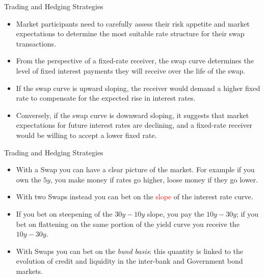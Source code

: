 \documentclass{beamer}
\begin{document}
\begin{frame}{Trading and Hedging Strategies}
\begin{itemize}
\item Market participants need to carefully assess their risk appetite and market expectations to determine the most suitable rate structure for their swap transactions.
\item From the perspective of a fixed-rate receiver, the swap curve determines the level of fixed interest payments they will receive over the life of the swap. 
\item If the swap curve is upward sloping, the receiver would demand a higher fixed rate to compensate for the expected rise in interest rates. 
\item Conversely, if the swap curve is downward sloping, it suggests that market expectations for future interest rates are declining, and a fixed-rate receiver would be willing to accept a lower fixed rate.
\end{itemize}
\end{frame}

\begin{frame}{Trading and Hedging Strategies}
	\begin{itemize}
		\item With a Swap you can have a clear picture of the market. For example if you own the $5y$, you make money if rates go higher, loose money if they go lower.
		\item With two Swaps instead you can bet on the \textcolor{red}{slope} of the interest rate curve.
		\item If you bet on steepening of the $30y-10y$ slope, you pay the $10y-30y$; if you bet on flattening on the same portion of the yield curve you receive the $10y-30y$.		
		\item With Swaps you can bet on the \emph{bund basis}: this quantity is linked to the evolution of credit and liquidity in the inter-bank and Government bond markets.
	\end{itemize}
\end{frame}
\end{document}
